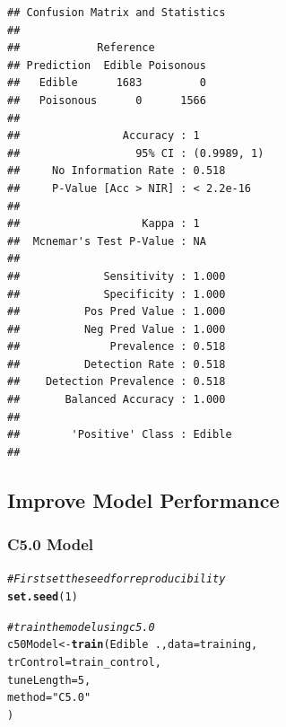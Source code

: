 \documentclass[10pt  ,usenames, dvipsnames]{article}\usepackage[]{graphicx}\usepackage[]{color}
\makeatletter
\newcommand{\hlnum}[1]{\textcolor[rgb]{0.686,0.059,0.569}{#1}}%
\newcommand{\hlstr}[1]{\textcolor[rgb]{0.192,0.494,0.8}{#1}}%
\newcommand{\hlcom}[1]{\textcolor[rgb]{0.678,0.584,0.686}{\textit{#1}}}%
\newcommand{\hlopt}[1]{\textcolor[rgb]{0,0,0}{#1}}%
\newcommand{\hlstd}[1]{\textcolor[rgb]{0.345,0.345,0.345}{#1}}%
\newcommand{\hlkwb}[1]{\textcolor[rgb]{0.69,0.353,0.396}{#1}}%
\newcommand{\hlkwc}[1]{\textcolor[rgb]{0.333,0.667,0.333}{#1}}%
\newcommand{\hlkwd}[1]{\textcolor[rgb]{0.737,0.353,0.396}{\textbf{#1}}}%
\newenvironment{kframe}{%
 \def\at@end@of@kframe{}%
 \ifinner\ifhmode%
  \def\at@end@of@kframe{\end{minipage}}%
  \begin{minipage}{\columnwidth}%
 \fi\fi%
 \def\FrameCommand##1{\hskip\@totalleftmargin \hskip-\fboxsep
 \colorbox{shadecolor}{##1}\hskip-\fboxsep
     \hskip-\linewidth \hskip-\@totalleftmargin \hskip\columnwidth}%
 \MakeFramed {\advance\hsize-\width
   \@totalleftmargin\z@ \linewidth\hsize
   \@setminipage}}%
 {\par\unskip\endMakeFramed%
 \at@end@of@kframe}
\newenvironment{knitrout}{}{} %
\makeatother
\begin{document}
\begin{knitrout}
\color{fgcolor}\begin{kframe}
\begin{verbatim}
## Confusion Matrix and Statistics
## 
##            Reference
## Prediction  Edible Poisonous
##   Edible      1683         0
##   Poisonous      0      1566
##                                      
##                Accuracy : 1          
##                  95% CI : (0.9989, 1)
##     No Information Rate : 0.518      
##     P-Value [Acc > NIR] : < 2.2e-16  
##                                      
##                   Kappa : 1          
##  Mcnemar's Test P-Value : NA         
##                                      
##             Sensitivity : 1.000      
##             Specificity : 1.000      
##          Pos Pred Value : 1.000      
##          Neg Pred Value : 1.000      
##              Prevalence : 0.518      
##          Detection Rate : 0.518      
##    Detection Prevalence : 0.518      
##       Balanced Accuracy : 1.000      
##                                      
##        'Positive' Class : Edible     
## 
\end{verbatim}
\end{kframe}
\end{knitrout}




\clearpage


\subsection{Improve Model Performance}

\subsubsection{C5.0 Model}

\begin{knitrout}
\color{fgcolor}\begin{kframe}
\begin{alltt}
\hlcom{#First set the seed for reproducibility}
\hlkwd{set.seed}\hlstd{(}\hlnum{1}\hlstd{)}

\hlcom{#train the model using c5.0}
\hlstd{c50Model}\hlkwb{<-} \hlkwd{train}\hlstd{(Edible}\hlopt{~}\hlstd{.,} \hlkwc{data}\hlstd{=training,}
                 \hlkwc{trControl}\hlstd{=train_control,}
                 \hlkwc{tuneLength}\hlstd{=}\hlnum{5}\hlstd{,}
                 \hlkwc{method}\hlstd{=}\hlstr{"C5.0"}
\hlstd{)}
\end{alltt}
\end{kframe}
\end{knitrout}
\end{document}

